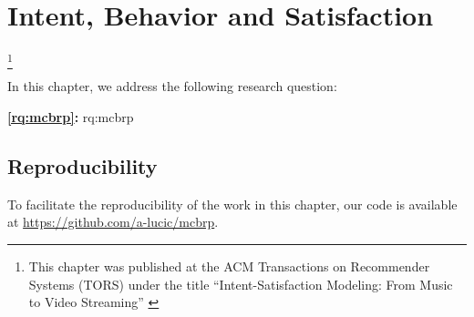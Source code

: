 
\chapter{Intent, Behavior and Satisfaction}
\label{chapter:research-intent}

\footnote[]{This chapter was published at the ACM Transactions on Recommender Systems (TORS) under the title ``Intent-Satisfaction Modeling: From Music to Video Streaming'' \citep{intent}}
\acresetall


In this chapter, we address the following research question:

\medskip
\noindent
\textbf{\ref{rq:mcbrp}:} \acl{rq:mcbrp}
\medskip

\noindent


% 
% 
% 
% 
% 
% 
% 



\section*{Reproducibility}
To facilitate the reproducibility of the work in this chapter, our code is available at \url{https://github.com/a-lucic/mcbrp}.